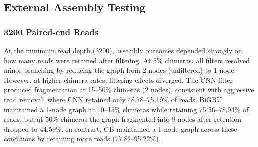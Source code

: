 


\subsection{External Assembly Testing}

\subsubsection{3200 Paired-end Reads}
At the minimum read depth (3200), assembly outcomes depended strongly on how many reads were retained after filtering. At 5\% chimeras, all filters resolved minor branching by reducing the graph from 2 nodes (unfiltered) to 1 node. However, at higher chimera rates, filtering effects diverged. The CNN filter produced fragmentation at 15--50\% chimeras (2 nodes), consistent with aggressive read removal, where CNN retained only 48.78--75.19\% of reads. BiGRU maintained a 1-node graph at 10--15\% chimeras while retaining 75.56--78.94\% of reads, but at 50\% chimeras the graph fragmented into 8 nodes after retention dropped to 44.59\%. In contrast, GB maintained a 1-node graph across these conditions by retaining more reads (77.88--95.22\%).

